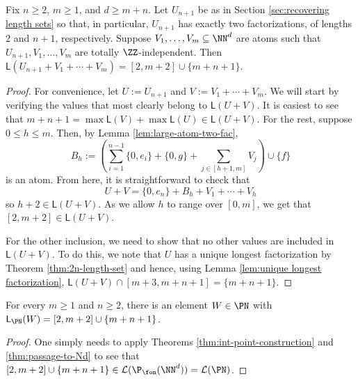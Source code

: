 \begin{thm} \label{thm:int-point-construction}
Fix $n\ge 2$, $m\ge 1$, and $d\ge m+n$.
Let $U_{n+1}$ be as in Section \ref{sec:recovering length sets} so that, in particular, $U_{n+1}$ has exactly two factorizations, of lengths $2$ and $n+1$, respectively.  
Suppose $V_1,\dots, V_m \subseteq \NN^d$ are atoms such that $U_{n+1},V_1,\dots, V_m$ are totally $\ZZ$-independent.
Then $\mathsf{L}(U_{n+1}+V_1+\cdots+V_m) = [ 2,m+2 ] \cup \{m+n+1\}$.
\end{thm}

\begin{proof}
For convenience, let $U := U_{n+1}$ and $V := V_1 + \cdots + V_m$.
We will start by verifying the values that most clearly belong to $\mathsf{L}(U+V)$.
It is easiest to see that $m+n+1 =\max\mathsf{L}(V)+\max\mathsf{L}(U) \in \mathsf{L}(U+V)$.
For the rest, suppose $0\le h \le m$.
Then, by Lemma \ref{lem:large-atom-two-fac}, 
\[B_h := \left( \sum_{i=1}^{n-1} \{0,e_i\} + \{0,g\} + \sum_{j\in [ h+1,m ]} V_j \right) \cup \{f\} \]
is an atom.
From here, it is straightforward to check that
\[ U+ V = \{0,e_n\} + B_h + V_1 + \cdots + V_h \]
so $h+2 \in \mathsf{L}(U+V)$.
As we allow $h$ to range over $[ 0,m ]$, we get that $[ 2,m+2 ] \in \mathsf{L}(U+V)$.

For the other inclusion, we need to show that no other values are included in $\mathsf{L}(U+V)$.
To do this, we note that $U$ has a unique longest factorization by Theorem \ref{thm:2n-length-set} and hence, using Lemma \ref{lem:unique longest factorization}, $\mathsf{L}(U+V) \cap [ m+3, m+n+1 ] = \{m+n+1\}$.
\end{proof}

\begin{cor}
For every $m\ge 1$ and $n\ge 2$, there is an element $W\in \PN$ with $\mathsf{L}_\PN(W) = [2,m+2]\cup\{m+n+1\}$.
\end{cor}

\begin{proof}
One simply needs to apply Theorems \ref{thm:int-point-construction} and \ref{thm:passage-to-Nd} to see that $[2,m+2]\cup\{m+n+1\}\in \mathcal{L}(\P_\fon(\NN^d)) = \mathcal{L}(\PN)$.
\end{proof}



